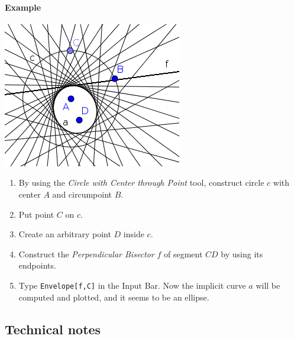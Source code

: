 \documentclass{article}
\begin{document}

\paragraph{Example}
\begin{center}
\includegraphics[scale=0.5]{Envelope-example}
\end{center}
\begin{enumerate}
    \item By using the \textit{Circle with Center through Point} tool, construct circle $c$ with center $A$ and circumpoint $B$.
    \item Put point $C$ on $c$.
    \item Create an arbitrary point $D$ inside $c$.
    \item Construct the \textit{Perpendicular Bisector} $f$ of segment $CD$ by using its endpoints.
    \item Type \texttt{Envelope[f,C]} in the Input Bar. Now the implicit curve $a$ will be computed and plotted, and it seems to be an ellipse.
\end{enumerate}


\subsection{Technical notes}
\end{document}
